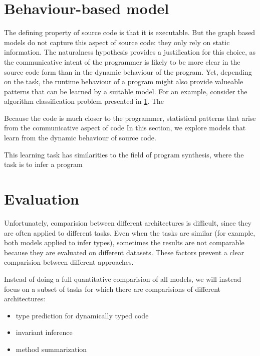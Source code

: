 \documentclass[sigconf,authordraft=true,nonacm=true]{acmart}
\begin{document}
\section{Behaviour-based model}
The defining property of source code is that it is executable.
But the graph based models do not capture this aspect of source code: they only rely on static information.
The naturalness hypothesis provides a justification for this choice, as the communicative intent of the programmer is likely to be more clear in the source code form than in the dynamic behaviour of the program.
Yet, depending on the task, the runtime behaviour of a program might also provide valueable patterns that can be learned by a suitable model.
For an example, consider the algorithm classification problem presented in \cref{ex:syntax-semantics}.
The

\begin{figure}
  \caption{}\label{ex:syntax-semantics}
\end{figure}


Because the code is much closer to the programmer, statistical patterns that arise from the communicative aspect of code
In this section, we explore models that learn from the dynamic behaviour of source code.

This learning task has similarities to the field of program synthesis, where the task is to infer a program


\section{Evaluation}\label{sec:eval}

Unfortunately, comparision between different architectures is difficult, since they are often applied to different tasks.
Even when the tasks are similar (for example, both models applied to infer types),
sometimes the results are not comparable because they are evaluated on different datasets.
These factors prevent a clear comparision between different approaches.

Instead of doing a full quantitative comparision of all models, we will instead focus on a subset of tasks for which there are comparisions of different architectures:

\begin{itemize}
  \item type prediction for dynamically typed code
  \item invariant inference
  \item method summarization
\end{itemize}
\end{document}
